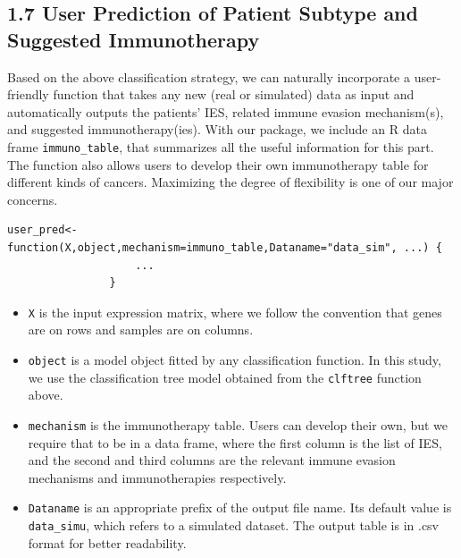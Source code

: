\documentclass[a4paper, 11pt]{article}
\begin{document}
\subsection*{1.7 User Prediction of Patient Subtype and Suggested Immunotherapy}
Based on the above classification strategy, we can naturally incorporate a user-friendly function that takes any new (real or simulated) data as input and automatically outputs the patients' IES, related immune evasion mechanism(s), and suggested immunotherapy(ies). With our package, we include an R data frame \texttt{immuno\_table}, that summarizes all the useful information for this part. The function also allows users to develop their own immunotherapy table for different kinds of cancers. Maximizing the degree of flexibility is one of our major concerns.
\begin{verbatim}
user_pred<-function(X,object,mechanism=immuno_table,Dataname="data_sim", ...) {
					...
				}
\end{verbatim}

\begin{itemize}
\item \texttt{X} is the input expression matrix, where we follow the convention that genes are on rows and samples are on columns.
\item \texttt{object} is a model object fitted by any classification function. In this study, we use the classification tree model obtained from the \texttt{clftree} function above.
\item \texttt{mechanism} is the immunotherapy table. Users can develop their own, but we require that to be in a data frame, where the first column is the list of IES, and the second and third columns are the relevant immune evasion mechanisms and immunotherapies respectively.
\item \texttt{Dataname} is an appropriate prefix of the output file name. Its default value is \texttt{data\_simu}, which refers to a simulated dataset. The output table is in .csv format for better readability.
\end{itemize}
\end{document}
